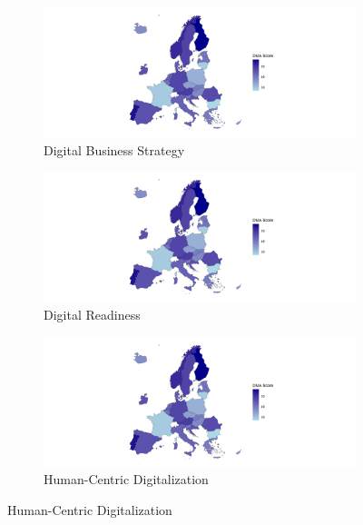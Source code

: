 \documentclass[12pt]{report}
\begin{document}
\begin{figure}[h!]
    \centering
    \begin{subfigure}[b]{0.49\textwidth}
        \centering
        \includegraphics[width=0.3\textheight,trim=225 0 225 0,clip]{../Output/map5.png}        
        \caption{Digital Business Strategy}
        \label{fig:map12}
    \end{subfigure}
    \hfill
    \begin{subfigure}[b]{0.49\textwidth}
        \centering
        \includegraphics[width=0.3\textheight,trim=225 0 225 0,clip]{../Output/map5.png}        
        \caption{Digital Readiness}
        \label{fig:map13}
    \end{subfigure}
    \vfill
    \begin{subfigure}[b]{0.49\textwidth}
        \centering
        \includegraphics[width=0.3\textheight,trim=225 0 225 0,clip]{../Output/map5.png}        
        \caption{Human-Centric Digitalization}

\end{subfigure}
\end{figure}
\end{document}
